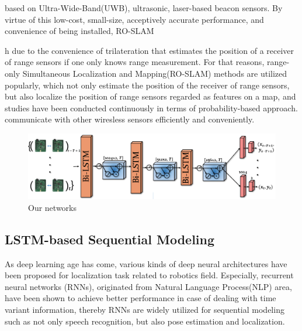 \documentclass[letterpaper, 10 pt, conference]{ieeeconf}  %
\begin{document}
based on Ultra-Wide-Band(UWB), ultrasonic, laser-based beacon sensors. By virtue of this low-cost, small-size, acceptively accurate performance, and convenience of being installed, RO-SLAM 


h due to the convenience of trilateration that estimates the position of a receiver of range sensors if one only knows range measurement. For that reasons, range-only Simultaneous Localization and Mapping(RO-SLAM) methods are utilized popularly, which not only estimate the position of the receiver of range sensors, but also localize the position of range sensors regarded as features on a map, and studies have been conducted continuously in terms of probability-based approach\cite{blanco2008pure,blanco2008efficient,fabresse2013undelayed, shetty2018particle}. communicate with other wiresless sensors efficiently and conveniently. 


 \begin{figure}[h]
	\centering
	\includegraphics[width=0.9\linewidth]{image/network_figure}
	\caption{Our networks}
	\label{fig:our_network} 	
\end{figure}

\subsection{LSTM-based Sequential Modeling}

As deep learning age has come\cite{lecun2015deep}, various kinds of deep neural architectures have been proposed for localization task related to robotics field\cite{kendall2016modelling, kendall2015posenet, gladh2016deep}. Especially, recurrent neural networks (RNNs), originated from Natural Language Process(NLP) area\cite{elman1990finding}, have been shown to achieve better performance in case of dealing with time variant information, thereby RNNs are widely utilized for sequential modeling such as not only speech recognition, but also pose estimation and localization.
\end{document}
